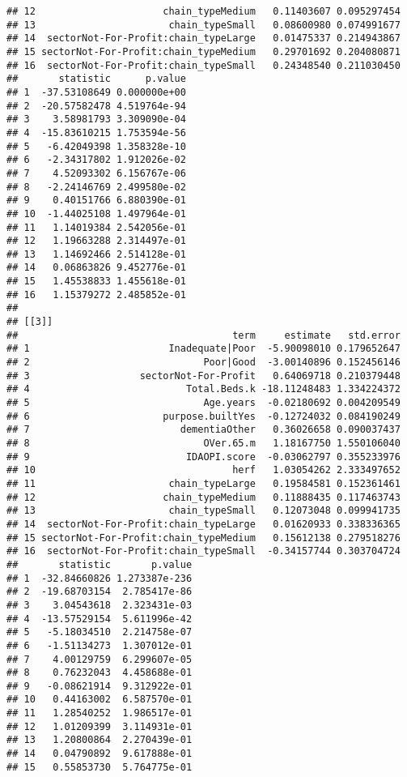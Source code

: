 \documentclass[]{article}
\begin{document}
\begin{verbatim}
## 12                      chain_typeMedium   0.11403607 0.095297454
## 13                       chain_typeSmall   0.08600980 0.074991677
## 14  sectorNot-For-Profit:chain_typeLarge   0.01475337 0.214943867
## 15 sectorNot-For-Profit:chain_typeMedium   0.29701692 0.204080871
## 16  sectorNot-For-Profit:chain_typeSmall   0.24348540 0.211030450
##       statistic      p.value
## 1  -37.53108649 0.000000e+00
## 2  -20.57582478 4.519764e-94
## 3    3.58981793 3.309090e-04
## 4  -15.83610215 1.753594e-56
## 5   -6.42049398 1.358328e-10
## 6   -2.34317802 1.912026e-02
## 7    4.52093302 6.156767e-06
## 8   -2.24146769 2.499580e-02
## 9    0.40151766 6.880390e-01
## 10  -1.44025108 1.497964e-01
## 11   1.14019384 2.542056e-01
## 12   1.19663288 2.314497e-01
## 13   1.14692466 2.514128e-01
## 14   0.06863826 9.452776e-01
## 15   1.45538833 1.455618e-01
## 16   1.15379272 2.485852e-01
## 
## [[3]]
##                                     term     estimate   std.error
## 1                        Inadequate|Poor  -5.90098010 0.179652647
## 2                              Poor|Good  -3.00140896 0.152456146
## 3                   sectorNot-For-Profit   0.64069718 0.210379448
## 4                           Total.Beds.k -18.11248483 1.334224372
## 5                              Age.years  -0.02180692 0.004209549
## 6                       purpose.builtYes  -0.12724032 0.084190249
## 7                          dementiaOther   0.36026658 0.090037437
## 8                              OVer.65.m   1.18167750 1.550106040
## 9                           IDAOPI.score  -0.03062797 0.355233976
## 10                                  herf   1.03054262 2.333497652
## 11                       chain_typeLarge   0.19584581 0.152361461
## 12                      chain_typeMedium   0.11888435 0.117463743
## 13                       chain_typeSmall   0.12073048 0.099941735
## 14  sectorNot-For-Profit:chain_typeLarge   0.01620933 0.338336365
## 15 sectorNot-For-Profit:chain_typeMedium   0.15612138 0.279518276
## 16  sectorNot-For-Profit:chain_typeSmall  -0.34157744 0.303704724
##       statistic       p.value
## 1  -32.84660826 1.273387e-236
## 2  -19.68703154  2.785417e-86
## 3    3.04543618  2.323431e-03
## 4  -13.57529154  5.611996e-42
## 5   -5.18034510  2.214758e-07
## 6   -1.51134273  1.307012e-01
## 7    4.00129759  6.299607e-05
## 8    0.76232043  4.458688e-01
## 9   -0.08621914  9.312922e-01
## 10   0.44163002  6.587570e-01
## 11   1.28540252  1.986517e-01
## 12   1.01209399  3.114931e-01
## 13   1.20800864  2.270439e-01
## 14   0.04790892  9.617888e-01
## 15   0.55853730  5.764775e-01

\end{verbatim}
\end{document}
